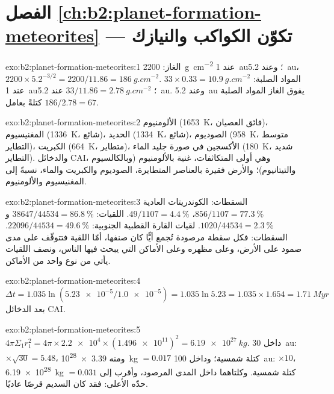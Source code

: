 \section*{الفصل \ref{ch:b2:planet-formation-meteorites} --- تكوّن الكواكب والنيازك}

\begin{solution}{exo:b2:planet-formation-meteorites:1}
الغاز: \qty{2200}{g.cm^{-2}} عند \qty{1}{au}؛ وعند \qty{5.2}{au}،
$2200\times5.2^{-3/2} = 2200/11.86 = \qty{186}{g.cm^{-2}}$. المواد الصلبة:
$33\times0.33 = \qty{10.9}{g.cm^{-2}}$ عند \qty{1}{au}؛
$33/11.86 = \qty{2.78}{g.cm^{-2}}$ عند \qty{5.2}{au}. وعند \qty{5.2}{au} يفوق الغاز
المواد الصلبة كتلةً بعامل $186/2.78 = 67$.
\end{solution}

\begin{solution}{exo:b2:planet-formation-meteorites:2}
الألومنيوم (\qty{1653}{K}، فائق العصيان)، المغنيسيوم (\qty{1336}{K}، شائع)،
الحديد (\qty{1334}{K}، شائع)، الصوديوم (\qty{958}{K}، متوسط التطاير)، الكبريت
(\qty{664}{K}، متطاير)، الأكسجين في صورة جليد الماء (\qty{180}{K}، شديد التطاير).
والدخائل CAI، وهي أولى المتكاثفات، غنية بالألومنيوم (وبالكالسيوم والتيتانيوم)؛
والأرض فقيرة بالعناصر المتطايرة، الصوديوم والكبريت والماء، نسبةً إلى
المغنيسيوم والألومنيوم.
\end{solution}

\begin{solution}{exo:b2:planet-formation-meteorites:3}
السقطات: الكوندريتات العادية $856/1107 = \qty{77.3}{\percent}$، 
$49/1107 = \qty{4.4}{\percent}$. اللقيات: $38647/44534 = \qty{86.8}{\percent}$
و$1020/44534 = \qty{2.3}{\percent}$. لقيات القارة القطبية الجنوبية: $22096/44534 =
\qty{49.6}{\percent}$. السقطات: فكل سقطة مرصودة تُجمع أيًّا كان
صنفها، أمّا اللقية فتتوقّف على مدى صمود  على الأرض،
وعلى مظهره وعلى الأماكن التي يبحث فيها الناس، ونصف اللقيات يأتي من نوع واحد من
الأماكن.
\end{solution}

\begin{solution}{exo:b2:planet-formation-meteorites:4}
$\Delta t = 1.035\ln(\num{5.23e-5}/\num{1.0e-5}) = 1.035\ln 5.23 =
1.035\times1.654 = \qty{1.71}{Myr}$ بعد الدخائل CAI.
\end{solution}

\begin{solution}{exo:b2:planet-formation-meteorites:5}
$4\pi\Sigma_1 r_1^2 = 4\pi\times\num{2.2e4}\times(\num{1.496e11})^2 =
\qty{6.19e27}{kg}$. داخل \qty{30}{au}: $\times\sqrt{30} = 5.48$، ومنه
\qty{3.39e28}{kg} $= 0.017$ كتلة شمسية؛ وداخل \qty{100}{au}: $\times10$،
\qty{6.19e28}{kg} $= 0.031$ كتلة شمسية. وكلتاهما داخل المدى المرصود،
وأقرب إلى حدّه الأعلى: فقد كان السديم قرصًا عاديًا.
\end{solution}

